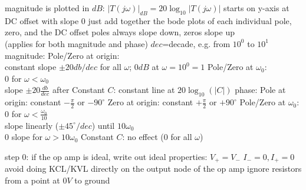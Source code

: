 \documentclass[12pt]{article}
\begin{document}
\begin{spacing}{0.8}
\begin{multicols*}{2}
\begin{flushleft}
\begin{outline}[longenum]
  \1 magnitude is plotted in $dB$: $|T(j\omega)|_{dB}=20\log_{10}|T(j\omega)|$
  \1 starts on y-axis at DC offset with slope 0
  \1 just add together the bode plots of each individual pole, zero, and the DC offset
  \1 poles always slope down, zeros slope up
    \\ (applies for both magnitude and phase)
  \1 $dec$=decade, e.g. from $10^0$ to $10^1$
  \1 magnitude:
    \2 Pole/Zero at origin:
      \\ constant slope $\pm20db/dec$ for all $\omega$; $0dB$ at $\omega=10^0=1$
    \2 Pole/Zero at $\omega_0$:
      \\ 0 for $\omega<\omega_0$
      \\ slope $\pm20\frac{db}{dec}$ after
    \2 Constant $C$: constant line at $20\log_{10}(|C|)$
  \1 phase:
    \2 Pole at origin: constant $-\frac{\pi}{2}$ or $-90^\circ$
    \2 Zero at origin: constant $+\frac{\pi}{2}$ or $+90^\circ$
    \2 Pole/Zero at $\omega_0$:
      \\ $0$ for $\omega<\frac{\omega_0}{10}$
      \\ slope linearly ($\pm45^\circ/dec$) until $10\omega_0$
      \\ $0$ slope for $\omega>10\omega_0$
    \2 Constant $C$: no effect ($0$ for all $\omega$)

	\1 step 0: if the op amp is ideal, write out ideal properties:
		\2 $V_+=V_-$
		\2 $I_-=0,I_+=0$
	\1 avoid doing KCL/KVL directly on the output node of the op amp
	\1 ignore resistors from a point at $0V$ to ground


\end{outline}
\end{flushleft}
\end{multicols*}
\end{spacing}
\end{document}
